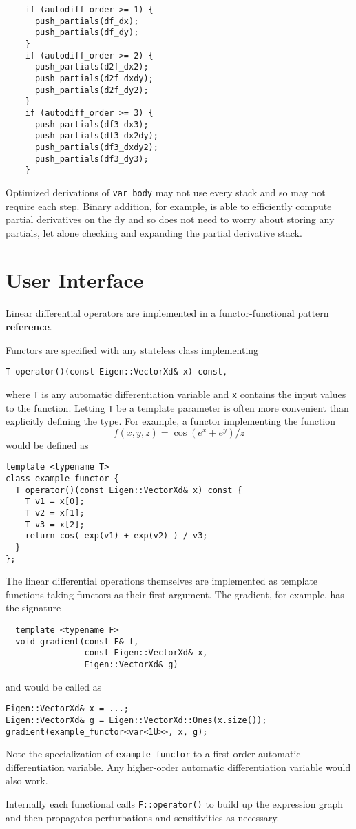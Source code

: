 %
\begin{verbatim}
    if (autodiff_order >= 1) {
      push_partials(df_dx);
      push_partials(df_dy);
    }
    if (autodiff_order >= 2) {
      push_partials(d2f_dx2);
      push_partials(d2f_dxdy);
      push_partials(d2f_dy2);
    }
    if (autodiff_order >= 3) {
      push_partials(df3_dx3);
      push_partials(df3_dx2dy);
      push_partials(df3_dxdy2);
      push_partials(df3_dy3);
    }
\end{verbatim}

Optimized derivations of \verb|var_body| may not use every stack and so may
not require each step.  Binary addition, for example, is able to efficiently 
compute partial derivatives on the fly and so does not need to worry about
storing any partials, let alone checking and expanding the partial derivative 
stack.

\section{User Interface} \label{sec:user_interface}

Linear differential operators are implemented in a functor-functional
pattern \textbf{reference}.

Functors are specified with any stateless class implementing
%
\begin{verbatim}
T operator()(const Eigen::VectorXd& x) const,
\end{verbatim}
%
where \verb|T| is any automatic differentiation variable and \verb|x|
contains the input values to the function.  Letting \verb|T| be
a template parameter is often more convenient than explicitly
defining the type.  For example, a functor implementing the function
%
\begin{equation*}
f \! \left( x, y, z \right) = \cos \! \left( e^{x} + e^{y} \right) / z
\end{equation*}
%
would be defined as
%
\begin{verbatim}
template <typename T>
class example_functor {
  T operator()(const Eigen::VectorXd& x) const {
    T v1 = x[0];
    T v2 = x[1];
    T v3 = x[2];
    return cos( exp(v1) + exp(v2) ) / v3;  
  }
};
\end{verbatim}

The linear differential operations themselves are implemented as
template functions taking functors as their first argument.  The 
gradient, for example, has the signature
%
\begin{verbatim}
  template <typename F>
  void gradient(const F& f,
                const Eigen::VectorXd& x,
                Eigen::VectorXd& g)
\end{verbatim}
%
and would be called as
%
\begin{verbatim}
Eigen::VectorXd& x = ...;
Eigen::VectorXd& g = Eigen::VectorXd::Ones(x.size());
gradient(example_functor<var<1U>>, x, g);
\end{verbatim}
%
Note the specialization of \verb|example_functor| to a first-order
automatic differentiation variable.  Any higher-order automatic
differentiation variable would also work.

Internally each functional calls \verb|F::operator()| to build up
the expression graph and then propagates perturbations and
sensitivities as necessary.
